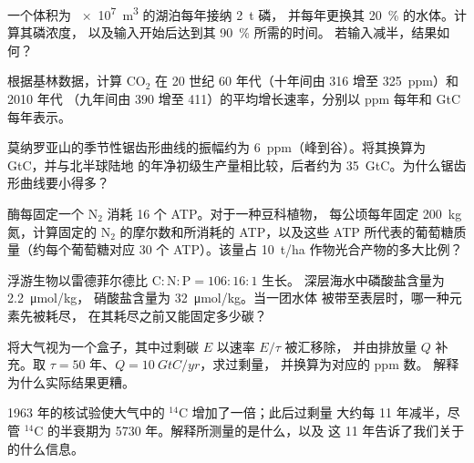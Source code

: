 \begin{exercise}[$\star\star$]\label{exo:b2:biogeochemical-cycles:5}
一个体积为 \qty{e7}{m^3} 的湖泊每年接纳 \qty{2}{t} 磷，
并每年更换其 \qty{20}{\%} 的水体。计算其磷浓度，
以及输入开始后达到其 \qty{90}{\%} 所需的时间。
若输入减半，结果如何？
\end{exercise}

\begin{exercise}[$\star\star$]\label{exo:b2:biogeochemical-cycles:6}
根据基林数据，计算 $\mathrm{CO_2}$ 在
20 世纪 60 年代（十年间由 316 增至 \qty{325}{ppm}）和 2010 年代
（九年间由 390 增至 411）的平均增长速率，分别以 ppm 每年和 GtC 每年表示。
\end{exercise}

\begin{exercise}[$\star\star$]\label{exo:b2:biogeochemical-cycles:7}
莫纳罗亚山的季节性锯齿形曲线的振幅约为
\qty{6}{ppm}（峰到谷）。将其换算为 GtC，并与北半球陆地
的年净初级生产量相比较，后者约为
\qty{35}{GtC}。为什么锯齿形曲线要小得多？
\end{exercise}

\begin{exercise}[$\star\star$]\label{exo:b2:biogeochemical-cycles:8}
酶每固定一个 $\mathrm{N_2}$ 消耗 16 个 ATP。对于一种豆科植物，
每公顷每年固定 \qty{200}{kg} 氮，计算固定的
$\mathrm{N_2}$ 的摩尔数和所消耗的 ATP，以及这些 ATP
所代表的葡萄糖质量（约每个葡萄糖对应 30 个 ATP）。该量占
\qty{10}{t/ha} 作物光合产物的多大比例？
\end{exercise}

\begin{exercise}[$\star\star$]\label{exo:b2:biogeochemical-cycles:9}
浮游生物以雷德菲尔德比 $\mathrm{C:N:P} = 106:16:1$ 生长。
深层海水中磷酸盐含量为 \qty{2.2}{\micro mol/kg}，
硝酸盐含量为 \qty{32}{\micro mol/kg}。当一团水体
被带至表层时，哪一种元素先被耗尽，
在其耗尽之前又能固定多少碳？
\end{exercise}

\begin{exercise}[$\star\star\star$]\label{exo:b2:biogeochemical-cycles:10}
将大气视为一个盒子，其中过剩碳 $E$ 以速率 $E/\tau$ 被汇移除，
并由排放量 $Q$ 补充。取 $\tau =
50$ 年、$Q = \qty{10}{GtC/yr}$，求过剩量，
并换算为对应的 ppm 数。
解释为什么实际结果更糟。
\end{exercise}

\begin{exercise}[$\star\star\star$]\label{exo:b2:biogeochemical-cycles:11}
1963 年的核试验使大气中的 $\mathrm{{}^{14}C}$ 增加了一倍；此后过剩量
大约每 11 年减半，尽管 $\mathrm{{}^{14}C}$
的半衰期为 5730 年。解释所测量的是什么，以及
这 11 年告诉了我们关于的什么信息。
\end{exercise}


